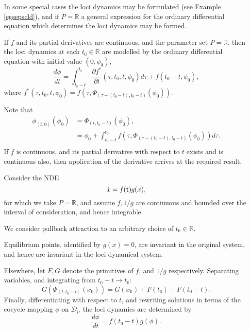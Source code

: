 In some special cases the loci dynamics may be formulated (see Example
\ref{egsepscld}), and if $P = \mathbb{R}$ a general expression for the ordinary
differential equation which determines the loci dynamics may be formed.

\begin{lemma}
If $f$ and its partial derivatives are continuous, and the parameter set $P
= \mathbb{R}$, then the loci dynamics at each $t_0 \in \mathbb{R}$ are modelled
by the ordinary differential equation with initial value $(0, \phi_0)$,
\begin{equation} \label{eqloci}
 \frac{d\phi}{dt} = \int_{t_0 - t}^{t_0}\frac{\partial f^*}{\partial t}(\tau,
   t_0, t, \phi_0) d\tau + f( t_0 - t, \phi_0),
\end{equation}
where $f^*(\tau, t_0, t, \phi_0) = f( \tau, \Phi_{(\tau
- (t_0 - t),  t_0 - t)}(\phi_0))$.
\end{lemma}
\begin{prf}
Note that
\begin{align*}
  \phi_{(t, 0)}(\phi_0) &= \Phi_{(t, t_0 - t)}(\phi_0), \\
       &= \phi_0 + \int_{t_0 - t}^{t_0} f(\tau, \Phi_{(\tau - (t_0-t), t_0 -
                   t)}(\phi_0))d\tau.
\\ \end{align*}
If $f$ is continuous, and its partial derivative with respect to $t$ exists and
is continuous also, then application of the derivative arrives at the required
result.
\end{prf}

\begin{eg}\label{egsepscld}
Consider the NDE
\[ \dot{x} = f( \mathsf{\mathsf{t}})g(x), \]
for which we take $P = \mathbb{R}$, and
assume $f, 1/g$ are continuous and bounded over the
interval of consideration, and hence integrable.

We consider pullback attraction to an arbitrary choice of $t_0 \in \mathbb{R}$.

Equilibrium points, identified by $g(x) = 0$, are
invariant in the original system, and hence are invariant in the loci
dynamical system.

Elsewhere, let $F, G$ denote the primitives of $f$, and
$1/g$ respectively. Separating variables, and integrating from $t_0 - t \to t_0$:
\[ G(\Phi_{(t, t_0-t)}(x_0)) = G(x_0)  + F(t_0) - F(t_0 - t). \]
Finally, differentiating with respect to $t$, and rewriting solutions in terms
of the cocycle mapping $\phi$ on $\mathcal{D}_l$, the loci dynamics are
determined by
\begin{equation}
\label{scaseeq}
 \frac{d \phi}{dt} = f( t_0 - t ) g(\phi).
\end{equation}
\end{eg}

